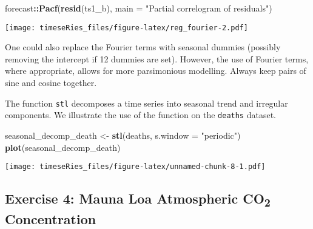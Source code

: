 \documentclass[]{book}
\newenvironment{Shaded}{\begin{snugshade}}{\end{snugshade}}
\newcommand{\DataTypeTok}[1]{\textcolor[rgb]{0.13,0.29,0.53}{#1}}
\newcommand{\KeywordTok}[1]{\textcolor[rgb]{0.13,0.29,0.53}{\textbf{#1}}}
\newcommand{\NormalTok}[1]{#1}
\newcommand{\OperatorTok}[1]{\textcolor[rgb]{0.81,0.36,0.00}{\textbf{#1}}}
\newcommand{\StringTok}[1]{\textcolor[rgb]{0.31,0.60,0.02}{#1}}
\begin{document}
\begin{Shaded}
\begin{Highlighting}[]
\NormalTok{forecast}\OperatorTok{::}\KeywordTok{Pacf}\NormalTok{(}\KeywordTok{resid}\NormalTok{(ts1_b), }\DataTypeTok{main =} \StringTok{"Partial correlogram of residuals"}\NormalTok{)}
\end{Highlighting}
\end{Shaded}

\texttt{[image: timeseRies\_files/figure-latex/reg\_fourier-2.pdf]}

One could also replace the Fourier terms with seasonal dummies (possibly
removing the intercept if 12 dummies are set). However, the use of
Fourier terms, where appropriate, allows for more parsimonious
modelling. Always keep pairs of sine and cosine together.

The function \texttt{stl} decomposes a time series into seasonal trend
and irregular components. We illustrate the use of the function on the
\texttt{deaths} dataset.

\begin{Shaded}
\begin{Highlighting}[]
\NormalTok{seasonal_decomp_death <-}\StringTok{ }\KeywordTok{stl}\NormalTok{(deaths, }\DataTypeTok{s.window =} \StringTok{"periodic"}\NormalTok{)}
\KeywordTok{plot}\NormalTok{(seasonal_decomp_death)}
\end{Highlighting}
\end{Shaded}

\texttt{[image: timeseRies\_files/figure-latex/unnamed-chunk-8-1.pdf]}

\hypertarget{exercise-4-mauna-loa-atmospheric-co2-concentration}{%
\subsection{\texorpdfstring{Exercise 4: Mauna Loa Atmospheric
CO\textsubscript{2}
Concentration}{Exercise 4: Mauna Loa Atmospheric CO2 Concentration}}\label{exercise-4-mauna-loa-atmospheric-co2-concentration}}
\end{document}
